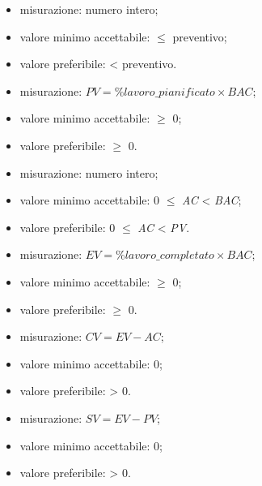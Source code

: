 			\begin{itemize}
				\item{misurazione: numero intero;}
				\item{valore minimo accettabile: $\leq$ preventivo;}
				\item{valore preferibile: < preventivo.}
			\end{itemize}
		
			\begin{itemize}
				\item{misurazione: $PV = \%lavoro\_pianificato \times BAC$;}
				\item{valore minimo accettabile: $\geq$ 0;}
				\item{valore preferibile: $\geq$ 0.}
			\end{itemize}
		
			\begin{itemize}
				\item{misurazione: numero intero;}
				\item{valore minimo accettabile: 0 $\leq$ \textit{AC} < \textit{BAC};}
				\item{valore preferibile: 0 $\leq$ \textit{AC} < \textit{PV}.}
			\end{itemize}
		
			\begin{itemize}
				\item{misurazione: $EV = \%lavoro\_completato \times BAC$;}
				\item{valore minimo accettabile: $\geq$ 0;}
				\item{valore preferibile: $\geq$ 0.}
			\end{itemize}

			\begin{itemize}
				\item{misurazione: $CV = EV - AC$;}
				\item{valore minimo accettabile: 0;}
				\item{valore preferibile: > 0.}
			\end{itemize}
		
			\begin{itemize}
				\item{misurazione: $SV = EV - PV$;}
				\item{valore minimo accettabile: 0;}
				\item{valore preferibile: > 0.}
			\end{itemize}